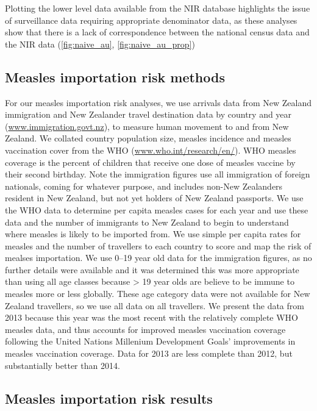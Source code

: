 \documentclass{article}
\begin{document}
Plotting the lower level data available from the NIR database highlights the issue of surveillance data requiring appropriate denominator data, as these analyses show that there is a lack of correspondence between the national census data and the NIR data (\autoref{fig:naive_au}, \autoref{fig:naive_au_prop})

\subsection{Measles importation risk methods}
\label{sub:imp_risk}
For our measles importation risk analyses, we use arrivals data from New Zealand immigration and New Zealander travel destination data by country and year (\href{http://www.immigration.govt.nz/}{www.immigration.govt.nz}), to measure human movement to and from New Zealand. We collated country population size, measles incidence and measles vaccination cover from the WHO (\href{http://www.who.int/research/en/}{www.who.int/research/en/}). WHO measles coverage is the percent of children that receive one dose of measles vaccine by their second birthday. Note the immigration figures use all immigration of foreign nationals, coming for whatever purpose, and includes non-New Zealanders resident in New Zealand, but not yet holders of New Zealand passports. We use the WHO data to determine per capita measles cases for each year and use these data and the number of immigrants to New Zealand to begin to understand where measles is likely to be imported from. We use simple per capita rates for measles and the number of travellers to each country to score and map the risk of mealses importation. We use 0--19 year old data for the immigration figures, as no further details were available and it was determined this was more appropriate than using all age classes because > 19 year olds are believe to be immune to measles more or less globally. These age category data were not available for New Zealand travellers, so we use all data on all travellers. We present the data from 2013 because this year was the most recent with the relatively complete WHO measles data, and thus accounts for improved measles vaccination coverage following the United Nations Millenium Development Goals' improvements in measles vaccination coverage. Data for 2013 are less complete than 2012, but substantially better than 2014.

\subsection{Measles importation risk results}
\end{document}

